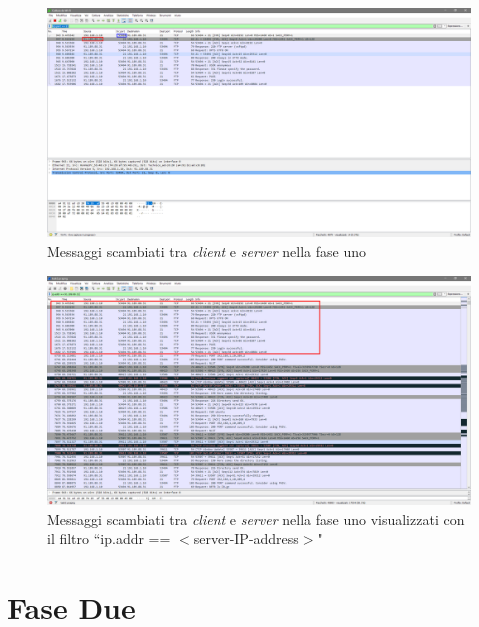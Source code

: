 \documentclass[a4paper, 12pt]{report}
\begin{document}
\begin{figure}[H]
	\centering
	\includegraphics[width=\linewidth]{images/image2_1.png}
	\caption{Messaggi scambiati tra \textit{client} e \textit{server} nella fase uno}
\end{figure}

\begin{figure}[H]
	\centering
	\includegraphics[width=\linewidth]{images/image2_1_1.png}
	\caption{Messaggi scambiati tra \textit{client} e \textit{server} nella fase uno visualizzati con il filtro ``ip.addr == $<$server-IP-address$>$"}
\end{figure}

\newpage

\section{Fase Due}
\end{document}
